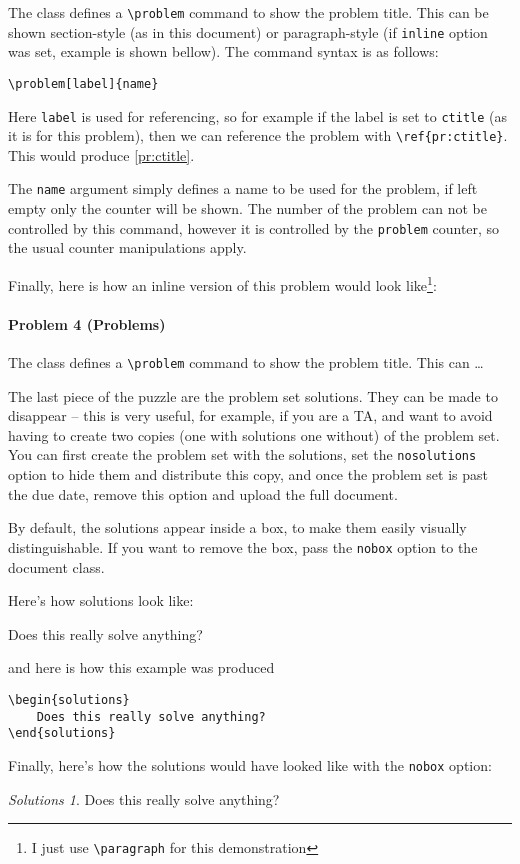 \documentclass[letterpaper,11pt]{pset}
\theoremstyle{remark}
\newtheorem*{solutionsa}{Solutions}
\begin{document}
The class defines a \texttt{\textbackslash{}problem} command to show the problem title. This can be shown section-style (as in this document) or paragraph-style (if \texttt{inline} option was set, example is shown bellow). The command syntax is as follows:
\begin{verbatim}
\problem[label]{name}
\end{verbatim}
Here \texttt{label} is used for referencing, so for example if the label is set to \texttt{ctitle} (as it is for this problem), then we can reference the problem with \texttt{\textbackslash{}ref\{pr:ctitle\}}. This would produce \ref{pr:ctitle}. 

The \texttt{name} argument simply defines a name to be used for the problem, if left empty only the counter will be shown. The number of the problem can not be controlled by this command, however it is controlled by the \texttt{problem} counter, so the usual counter manipulations apply.

Finally, here is how an inline version of this problem would look like\footnote{I just use \texttt{\textbackslash{}paragraph} for this demonstration}:

\paragraph{\textsf{Problem 4 (Problems)}}
The class defines a \texttt{\textbackslash{}problem} command to show the problem title. This can \ldots

The last piece of the puzzle are the problem set solutions. They can be made to disappear -- this is very useful, for example, if you are a TA, and want to avoid having to create two copies (one with solutions one without) of the problem set. You can first create the problem set with the solutions, set the \texttt{nosolutions} option to hide them and distribute this copy, and once the problem set is past the due date, remove this option and upload the full document.

By default, the solutions appear inside a box, to make them easily visually distinguishable. If you want to remove the box, pass the \texttt{nobox} option to the document class.

Here's how solutions look like:
\begin{solutions}
Does this really solve anything?
\end{solutions}
and here is how this example was produced
\begin{verbatim}
\begin{solutions}
    Does this really solve anything?
\end{solutions}
\end{verbatim}

Finally, here's how the solutions would have looked like with the \texttt{nobox} option:
\begin{solutionsa}
Does this really solve anything?
\end{solutionsa}
\end{document}
